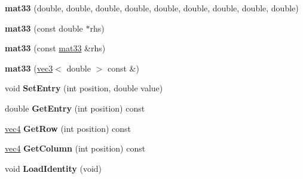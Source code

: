 \begin{DoxyCompactItemize}
\item 
\hypertarget{classmath_1_1mat33_a6abbf85287e3e35c6a01b5320a579a26}{
{\bfseries mat33} (double, double, double, double, double, double, double, double, double)}
\label{classmath_1_1mat33_a6abbf85287e3e35c6a01b5320a579a26}

\item 
\hypertarget{classmath_1_1mat33_aff2a5d2ab9fc74ae270700f5cb208ef4}{
{\bfseries mat33} (const double $\ast$rhs)}
\label{classmath_1_1mat33_aff2a5d2ab9fc74ae270700f5cb208ef4}

\item 
\hypertarget{classmath_1_1mat33_af62b61a10eb3c84a0fb87a3372300222}{
{\bfseries mat33} (const \hyperlink{classmath_1_1mat33}{mat33} \&rhs)}
\label{classmath_1_1mat33_af62b61a10eb3c84a0fb87a3372300222}

\item 
\hypertarget{classmath_1_1mat33_a412f9a6d88bff3038e083ac7fc2ffde9}{
{\bfseries mat33} (\hyperlink{classmath_1_1vec3}{vec3}$<$ double $>$ const \&)}
\label{classmath_1_1mat33_a412f9a6d88bff3038e083ac7fc2ffde9}

\item 
\hypertarget{classmath_1_1mat33_aaa68620413d419b5ae1a845e366fa6c3}{
void {\bfseries SetEntry} (int position, double value)}
\label{classmath_1_1mat33_aaa68620413d419b5ae1a845e366fa6c3}

\item 
\hypertarget{classmath_1_1mat33_ab55608e36dc4af2f5eca759dafe008aa}{
double {\bfseries GetEntry} (int position) const }
\label{classmath_1_1mat33_ab55608e36dc4af2f5eca759dafe008aa}

\item 
\hypertarget{classmath_1_1mat33_adc5464a0e20c3879157f4bfeb1255761}{
\hyperlink{classmath_1_1vec4}{vec4} {\bfseries GetRow} (int position) const }
\label{classmath_1_1mat33_adc5464a0e20c3879157f4bfeb1255761}

\item 
\hypertarget{classmath_1_1mat33_ad88f01af243e8619de7ae8d7e0f69730}{
\hyperlink{classmath_1_1vec4}{vec4} {\bfseries GetColumn} (int position) const }
\label{classmath_1_1mat33_ad88f01af243e8619de7ae8d7e0f69730}

\item 
\hypertarget{classmath_1_1mat33_a223a1a66518968317fd3500b69b43744}{
void {\bfseries LoadIdentity} (void)}
\label{classmath_1_1mat33_a223a1a66518968317fd3500b69b43744}


\end{DoxyCompactItemize}
